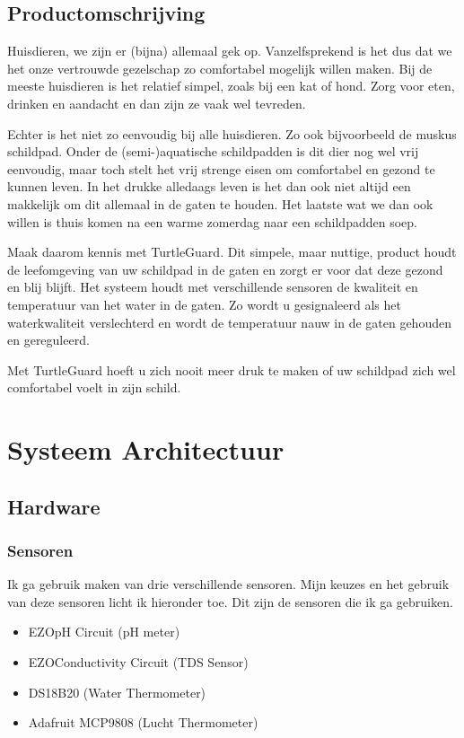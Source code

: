\documentclass[a4paper]{report}
\newcommand{\turtleguard}{\mbox{TurtleGuard\texttrademark}\xspace}
\begin{document}
\section{Productomschrijving}
\label{section-product}
Huisdieren, we zijn er (bijna) allemaal gek op. Vanzelfsprekend is het dus dat we het onze vertrouwde gezelschap zo comfortabel mogelijk willen maken.
Bij de meeste huisdieren is het relatief simpel, \mbox{zoals} bij een kat of hond. Zorg voor eten, drinken en aandacht en dan zijn ze vaak wel tevreden.
\par \smallskip
Echter is het niet zo eenvoudig bij alle huisdieren. Zo ook bijvoorbeeld de muskus schildpad.
Onder de (semi-)aquatische schildpadden is dit dier nog wel vrij eenvoudig, maar toch stelt het vrij strenge eisen om comfortabel en gezond te kunnen leven.
In het drukke alledaags leven is het dan ook niet altijd een makkelijk om dit allemaal in de gaten te houden.
Het laatste wat we dan ook willen is thuis komen na een warme zomerdag naar een schildpadden soep.
\par \smallskip 
Maak daarom kennis met \turtleguard. Dit simpele, maar nuttige, product houdt de leefomgeving van uw schildpad in de gaten en zorgt er voor dat deze gezond en blij blijft.
Het systeem houdt met verschillende sensoren de kwaliteit en temperatuur van het water in de gaten. 
Zo wordt u gesignaleerd als het waterkwaliteit verslechterd en wordt de temperatuur nauw in de gaten gehouden en gereguleerd.
\par \smallskip 
Met \turtleguard hoeft u zich nooit meer druk te maken of uw schildpad zich wel comfortabel voelt in zijn schild. 

\chapter{Systeem Architectuur}
\section{Hardware}
\subsection{Sensoren}
Ik ga gebruik maken van drie verschillende sensoren. Mijn keuzes en het gebruik van deze sensoren licht ik hieronder toe.
Dit zijn de sensoren die ik ga gebruiken.
\begin{itemize}
  \item EZO\texttrademark \space pH Circuit (pH meter)
  \item EZO\texttrademark \space Conductivity Circuit (TDS Sensor)
  \item DS18B20 (Water Thermometer)
  \item Adafruit MCP9808 (Lucht Thermometer)
\end{itemize}
\end{document}

